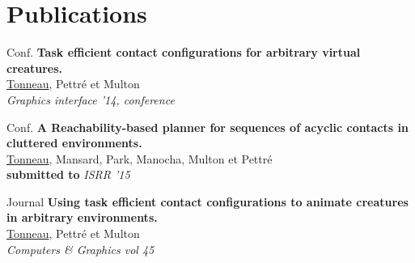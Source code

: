 \documentclass{tccv}
\begin{document}
\section{Publications}
\begin{factlist}

\item{Conf.} 
     {\textbf{Task efficient contact configurations for 
arbitrary virtual creatures.} \\
\underline{Tonneau}, Pettr\'e et Multon \\
\textit{Graphics interface ’14, conference }
}

\item{Conf.} 
     {\textbf{A Reachability-based planner for sequences
of acyclic contacts in cluttered environments.} \\
\underline{Tonneau}, Mansard, Park, Manocha, Multon et Pettr\'e\\
\textbf{submitted to} \textit{ISRR '15}
}


\item{Journal} 
     {\textbf{Using task efficient contact configurations to animate 
creatures in arbitrary environments.} \\
\underline{Tonneau}, Pettr\'e et Multon \\
\textit{Computers \& Graphics vol 45}
}

\end{factlist}

\end{document}
